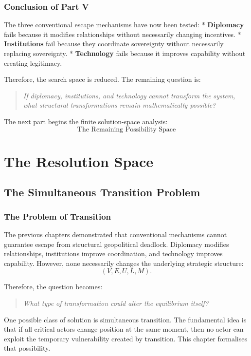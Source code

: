 \documentclass[11pt,openany]{book}
\theoremstyle{plain}
\theoremstyle{definition}
\begin{document}
\section*{Conclusion of Part V}

The three conventional escape mechanisms have now been tested:
* \textbf{Diplomacy} fails because it modifies relationships without necessarily changing incentives.
* \textbf{Institutions} fail because they coordinate sovereignty without necessarily replacing sovereignty.
* \textbf{Technology} fails because it improves capability without creating legitimacy.

Therefore, the search space is reduced. The remaining question is:
\begin{quote}
\textit{If diplomacy, institutions, and technology cannot transform the system, what structural transformations remain mathematically possible?}
\end{quote}

The next part begins the finite solution-space analysis:
\[
\boxed{
\text{The Remaining Possibility Space}
}
\]


\part{The Resolution Space}


\chapter{The Simultaneous Transition Problem}

\section*{The Problem of Transition}

The previous chapters demonstrated that conventional mechanisms cannot guarantee escape from structural geopolitical deadlock. Diplomacy modifies relationships, institutions improve coordination, and technology improves capability. However, none necessarily changes the underlying strategic structure:
\[
(V, E, U, L, M).
\]

Therefore, the question becomes:
\begin{quote}
\textit{What type of transformation could alter the equilibrium itself?}
\end{quote}

One possible class of solution is simultaneous transition. The fundamental idea is that if all critical actors change position at the same moment, then no actor can exploit the temporary vulnerability created by transition. This chapter formalises that possibility.
\end{document}
